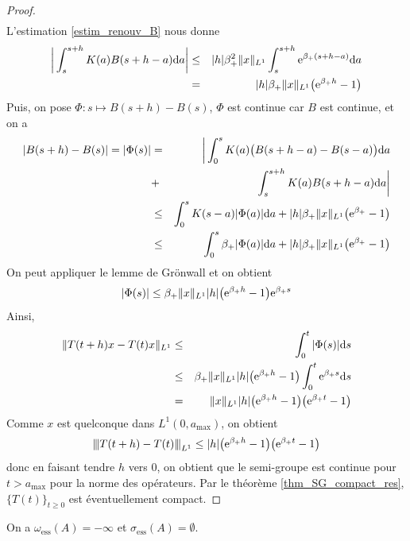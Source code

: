 \begin{proof}
\begin{eqnarray*}
    \end{eqnarray*}
    L'estimation \eqref{estim_renouv_B} nous donne
    \begin{eqnarray*}
        \bigg|\int_s^{s+h}K(a)B(s+h-a)\mathrm{d} a \bigg| &\leq& |h|\beta_+^2 \|x\|_{L^1}\int_s^{s+h}\mathrm{e}^{\beta_+(s+h-a)}\mathrm{d} a \\
        &=& |h|\beta_+\|x\|_{L^1}\big(\mathrm{e}^{\beta_+h}-1\big)
    \end{eqnarray*}
    Puis, on pose $\Phi : s \mapsto B(s+h)-B(s)$, $\Phi$ est continue car $B$ est continue, et on a 
    \begin{eqnarray*}
        |B(s+h)-B(s)| = |\Phi(s)| &=& \bigg| \int_0^sK(a)\big(B(s+h-a)-B(s-a)\big)\mathrm{d} a \\
        &+& \int_s^{s+h}K(a)B(s+h-a)\mathrm{d} a \bigg| \\
        &\leq& \int_0^s K(s-a)|\Phi(a)|\mathrm{d} a + |h|\beta_+\|x\|_{L^1}\big(\mathrm{e}^{\beta_+}-1\big) \\
        &\leq&\int_0^s \beta_+|\Phi(a)|\mathrm{d} a + |h|\beta_+\|x\|_{L^1}\big(\mathrm{e}^{\beta_+}-1\big)
    \end{eqnarray*}
    On peut appliquer le lemme de Grönwall et on obtient 
    \begin{equation*}
        |\Phi(s)| \leq \beta_+\|x\|_{L^1}|h|\big(\mathrm{e}^{\beta_+h}-1\big)\mathrm{e}^{\beta_+s}
    \end{equation*}
    Ainsi, 
    \begin{eqnarray*}
        \|T(t+h)x-T(t)x\|_{L^1} &\leq& \int_0^t|\Phi(s)|\mathrm{d} s \\
        &\leq& \beta_+\|x\|_{L^1}|h|\big(\mathrm{e}^{\beta_+h}-1\big)\int_0^t\mathrm{e}^{\beta_+s}\mathrm{d} s \\
        &=& \|x\|_{L^1}|h|\big(\mathrm{e}^{\beta_+h}-1\big)\big(\mathrm{e}^{\beta_+t}-1\big)
    \end{eqnarray*}
    Comme $x$ est quelconque dans $L^1(0,a_{\max})$, on obtient 
    \begin{equation*}
        {\left\vert\kern-0.25ex\left\vert \kern-0.25ex\left\vert T(t+h)-T(t) \right\vert\kern-0.25ex\right\vert\kern-0.25ex\right\vert}_{L^1} \leq |h|\big(\mathrm{e}^{\beta_+h}-1\big)\big(\mathrm{e}^{\beta_+t}-1\big)
    \end{equation*}
    donc en faisant tendre $h$ vers $0$, on obtient que le semi-groupe est continue pour $t>a_{\max}$ pour la norme des opérateurs. Par le théorème \ref{thm_SG_compact_res}, $\big\{T(t)\big\}_{t \geq 0}$ est éventuellement compact.
\end{proof}

\begin{corollaire}
    On a  $\omega_{\text{ess}}(A)=-\infty$ et $\sigma_{\text{ess}}(A)=\emptyset$.
\end{corollaire}

